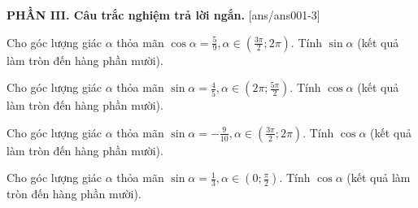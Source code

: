 \documentclass[12pt,a4paper]{article}
\begin{document}
{\bf PHẦN III. Câu trắc nghiệm trả lời ngắn.}
\setcounter{ex}{0}
[ans/ans001-3]
\begin{ex}
 Cho góc lượng giác $\alpha$ thỏa mãn $\cos \alpha=\frac{5}{9}, \alpha \in \left( \frac{3 \pi}{2}; 2\pi \right)$. Tính $\sin\alpha$ (kết quả làm tròn đến hàng phần mười).\\ 

\end{ex}

\begin{ex}
 Cho góc lượng giác $\alpha$ thỏa mãn $\sin \alpha=\frac{4}{5}, \alpha \in \left( 2\pi;\frac{5 \pi}{2} \right)$. Tính $\cos\alpha$ (kết quả làm tròn đến hàng phần mười).\\ 

\end{ex}

\begin{ex}
 Cho góc lượng giác $\alpha$ thỏa mãn $\sin \alpha=- \frac{9}{10}, \alpha \in \left( \frac{3 \pi}{2}; 2\pi \right)$. Tính $\cos\alpha$ (kết quả làm tròn đến hàng phần mười).\\ 

\end{ex}

\begin{ex}
 Cho góc lượng giác $\alpha$ thỏa mãn $\sin \alpha=\frac{1}{3}, \alpha \in \left( 0;\frac{\pi}{2} \right)$. Tính $\cos\alpha$ (kết quả làm tròn đến hàng phần mười).\\ 

\end{ex}
\end{document}
